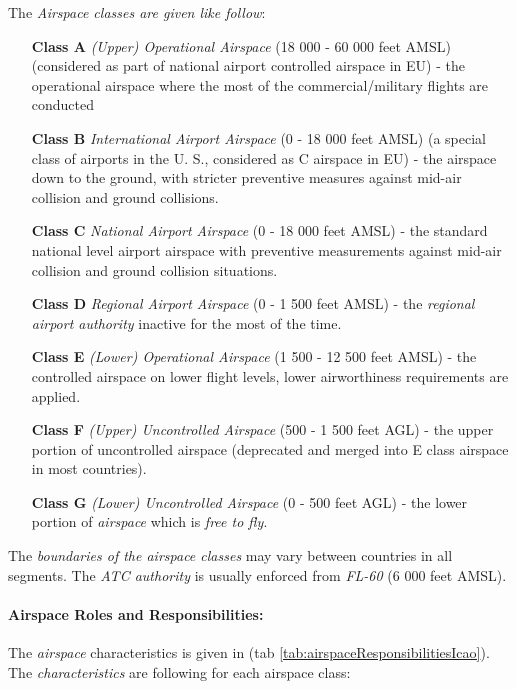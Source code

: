 \noindent The \emph{Airspace classes are given like follow}:
\begin{enumerate}
    \item[\textbf{Class A}] \emph{(Upper) Operational Airspace} (18 000 - 60 000 feet AMSL) (considered as part of national airport controlled airspace in EU) - the operational airspace where the most of the commercial/military flights are conducted
    
    \item[\textbf{Class B}] \emph{International Airport Airspace} (0 - 18 000 feet AMSL) (a special class of airports in the U. S., considered as C airspace in EU) - the airspace down to the ground, with stricter preventive measures against mid-air collision and ground collisions.
    
    \item[\textbf{Class C}] \emph{National Airport Airspace} (0 - 18 000 feet AMSL) - the standard  national level airport airspace with preventive measurements against mid-air collision and ground collision situations.
    
    \item[\textbf{Class D}] \emph{Regional Airport Airspace} (0 - 1 500 feet AMSL) - the \emph{regional airport authority} inactive for the most of the time.
    
    \item[\textbf{Class E}] \emph{(Lower) Operational Airspace} (1 500 - 12 500 feet AMSL) - the controlled airspace on lower flight levels, lower airworthiness requirements are applied.
    
    \item[\textbf{Class F}] \emph{(Upper) Uncontrolled Airspace} (500 - 1 500 feet AGL) - the upper portion of uncontrolled airspace (deprecated and merged into E class airspace in most countries).
    
    \item[\textbf{Class G}] \emph{(Lower) Uncontrolled Airspace} (0 - 500 feet AGL) - the lower portion of \emph{airspace} which is \emph{free to fly}.
\end{enumerate}

\begin{note}
    The \emph{boundaries of the airspace classes} may vary between countries in all segments. The \emph{ATC authority} is usually enforced from \emph{FL-60} (6 000 feet AMSL).
\end{note}


\paragraph{Airspace Roles and Responsibilities:} The \emph{airspace} characteristics is given in (tab \ref{tab:airspaceResponsibilitiesIcao}). The \emph{characteristics} are following for each airspace class:

